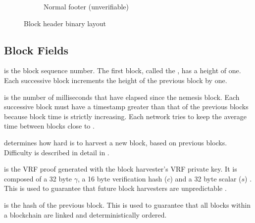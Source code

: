 \begin{figure}
{\begin{subfigure}{.33\textwidth}
{				
			}{Normal footer (unverifiable)}
			\vspace{28pt}
		\end{subfigure}
	}{Block header binary layout}
\end{figure}

\subsection{Block Fields}

 is the block sequence number.
The first block, called the , has a height of one.
Each successive block increments the height of the previous block by one.

 is the number of milliseconds that have elapsed since the nemesis block.
Each successive block must have a timestamp greater than that of the previous blocks because block time is strictly increasing.
Each network tries to keep the average time between blocks close to .

 determines how hard is to harvest a new block, based on previous blocks.
Difficulty is described in detail in .

 is the VRF proof generated with the block harvester's VRF private key.
It is composed of a 32 byte $\gamma$, a 16 byte verification hash ($c$) and a 32 byte scalar ($s$) .
This is used to guarantee that future block harvesters are unpredictable .

 is the hash of the previous block.
This is used to guarantee that all blocks within a blockchain are linked and deterministically ordered.

